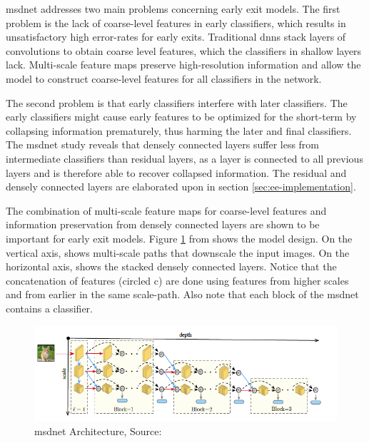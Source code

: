 \gls{msdnet} \cite{huang_densely_2016} addresses two main problems concerning early exit models. The first problem is the lack of coarse-level features in early classifiers, which results in unsatisfactory high error-rates for early exits. Traditional \gls{dnn}s stack layers of convolutions to obtain coarse level features, which the classifiers in shallow layers lack. Multi-scale feature maps preserve high-resolution information and allow the model to construct coarse-level features for all classifiers in the network. 

The second problem is that early classifiers interfere with later classifiers. The early classifiers might cause early features to be optimized for the short-term by collapsing information prematurely, thus harming the later and final classifiers. The \gls{msdnet} \cite{huang_multi-scale_2017} study reveals that densely connected layers suffer less from intermediate classifiers than residual layers, as a layer is connected to all previous layers and is therefore able to recover collapsed information. The residual and densely connected layers are elaborated upon in section \ref{sec:ee-implementation}.

The combination of multi-scale feature maps for coarse-level features and information preservation from densely connected layers are shown to be important for early exit models. Figure \ref{fig:msdnet} from \cite{huang_multi-scale_2017} shows the model design. On the vertical axis, shows multi-scale paths that downscale the input images. On the horizontal axis, shows the stacked densely connected layers. Notice that the concatenation of features (circled c) are done using features from higher scales and from earlier in the same scale-path. Also note that each block of the \gls{msdnet} contains a classifier.
\begin{figure}
	\centering
	\includegraphics[width=\linewidth]{figures/models/msdnet}
	\caption[\gls{msdnet} Architecture]{\gls{msdnet} Architecture, Source:  \cite{huang_multi-scale_2017}}
	\label{fig:msdnet}
\end{figure}

